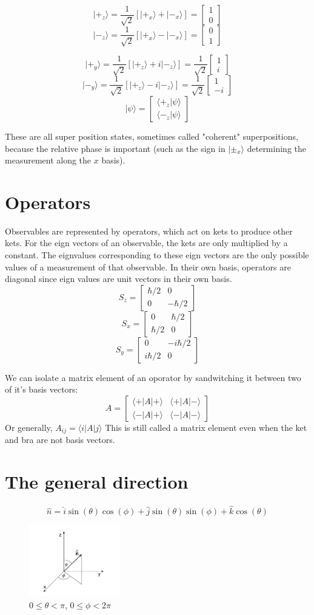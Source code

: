 \documentclass{homework}
\newcommand{\m}[1]{\begin{bmatrix} #1 \end{bmatrix}}
\newcommand{\kt}{\rangle}
\newcommand{\br}{\langle}
\begin{document}
\[| +_z \kt = \frac{1}{\sqrt{2}}[|+_x \kt + |-_x \kt] =  \m{ 1\\ 0}\]
\[| -_z \kt = \frac{1}{\sqrt{2}}[|+_x \kt - |-_x \kt] = \m{ 0\\ 1}\]

\[| +_y \kt = \frac{1}{\sqrt{2}}[|+_z \kt + i|-_z \kt] = \frac{1}{\sqrt{2}} \m{ 1\\ i}\]
\[| -_y \kt = \frac{1}{\sqrt{2}}[|+_z  \kt - i|-_z \kt] = \frac{1}{\sqrt{2}} \m{ 1\\ -i}\]
\[| \psi  \kt = \m{\br +_z|\psi \kt \\ \br -_z|\psi \kt}\]

These are all super position states, sometimes called "coherent" superpositions, because the relative phase is important (such as the sign in $| \pm_x \kt$ determining the measurement along the $x$ basis).

\section{Operators}

Observables are represented by operators, which act on kets to produce other kets. For the eign vectors of an observable, the kets are only multiplied by a constant. The eignvalues corresponding to these eign vectors are the only possible values of a measurement of that observable.
In their own basis, operators are diagonal since eign values are unit vectors in their own basis.
\[S_z = \m{\hbar/2 & 0 \\ 0 & -\hbar/2}\]
\[S_x = \m{  0 & \hbar/2 \\ \hbar/2 & 0}\]
\[S_y = \m{ 0 & -i\hbar/2\\ i\hbar/2 & 0 }\]



We can isolate a matrix element of an oporator by sandwitching it between two of it's basis vectors:
\[A = \m{\br + | A | + \kt & \br + | A | - \kt \\ \br - | A | + \kt & \br - | A | - \kt}\]
Or generally, $A_{ij} = \br i | A | j \kt$
This is still called a matrix element even when the ket and bra are not basis vectors.

\section{The general direction}
\[ \hat{n} = \hat{i}\sin(\theta)\cos(\phi)+ \hat{j}\sin(\theta)\sin(\phi) + \hat{k}\cos(\theta)\]

\begin{figure}[htp]
    \centering
    \includegraphics[width=4cm]{sphericalangles}
    \caption{$0 \leq \theta < \pi$, $0 \leq \phi < 2\pi$}

\end{figure}
\end{document}
